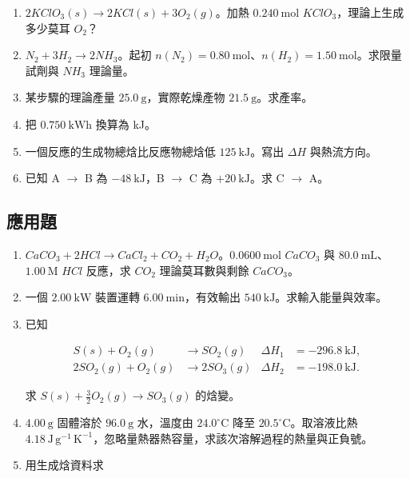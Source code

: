 \documentclass[11pt,a4paper]{article}
\providecommand{\tightlist}{%
  \setlength{\itemsep}{0pt}\setlength{\parskip}{0pt}}
\begin{document}
\begin{enumerate}
\def\labelenumi{\arabic{enumi}.}
\tightlist
\item
  \(2KClO_3(s)\rightarrow2KCl(s)+3O_2(g)\)。加熱 \(0.240\ \mathrm{mol}\) \(KClO_3\)，理論上生成多少莫耳 \(O_2\)？
\item
  \(N_2+3H_2\rightarrow2NH_3\)。起初 \(n(N_2)=0.80\ \mathrm{mol}\)、\(n(H_2)=1.50\ \mathrm{mol}\)。求限量試劑與 \(NH_3\) 理論量。
\item
  某步驟的理論產量 \(25.0\ \mathrm g\)，實際乾燥產物 \(21.5\ \mathrm g\)。求產率。
\item
  把 \(0.750\ \mathrm{kWh}\) 換算為 kJ。
\item
  一個反應的生成物總焓比反應物總焓低 \(125\ \mathrm{kJ}\)。寫出 \(\Delta H\) 與熱流方向。
\item
  已知 A \(\rightarrow\) B 為 \(-48\ \mathrm{kJ}\)，B \(\rightarrow\) C 為 \(+20\ \mathrm{kJ}\)。求 C \(\rightarrow\) A。
\end{enumerate}

\subsection{應用題}\label{ux61c9ux7528ux984c}

\begin{enumerate}
\def\labelenumi{\arabic{enumi}.}
\setcounter{enumi}{6}
\item
  \(CaCO_3+2HCl\rightarrow CaCl_2+CO_2+H_2O\)。\(0.0600\ \mathrm{mol}\) \(CaCO_3\) 與 \(80.0\ \mathrm{mL}\)、\(1.00\ \mathrm M\) \(HCl\) 反應，求 \(CO_2\) 理論莫耳數與剩餘 \(CaCO_3\)。
\item
  一個 \(2.00\ \mathrm{kW}\) 裝置運轉 \(6.00\ \mathrm{min}\)，有效輸出 \(540\ \mathrm{kJ}\)。求輸入能量與效率。
\item
  已知

  \[
  \begin{aligned}
  S(s)+O_2(g)&\rightarrow SO_2(g)&\Delta H_1&=-296.8\ \mathrm{kJ},\\
  2SO_2(g)+O_2(g)&\rightarrow2SO_3(g)&\Delta H_2&=-198.0\ \mathrm{kJ}.
  \end{aligned}
  \]

  求 \(S(s)+\frac32O_2(g)\rightarrow SO_3(g)\) 的焓變。
\item
  \(4.00\ \mathrm g\) 固體溶於 \(96.0\ \mathrm g\) 水，溫度由 \(24.0^\circ\mathrm C\) 降至 \(20.5^\circ\mathrm C\)。取溶液比熱 \(4.18\ \mathrm{J\,g^{-1}\,K^{-1}}\)，忽略量熱器熱容量，求該次溶解過程的熱量與正負號。
\item
  用生成焓資料求
\end{enumerate}
\end{document}
